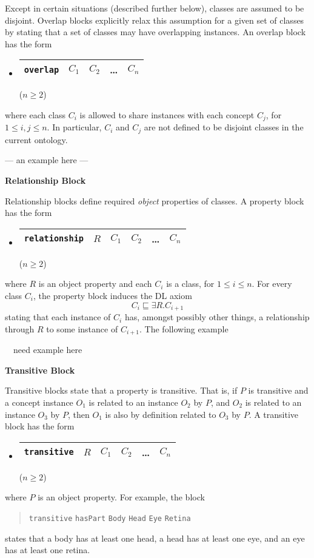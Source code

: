 \documentclass[preprint,number]{elsarticle}
\newcommand{\mypara}[1]{\vspace{12pt}\noindent\textbf{#1}}
\begin{document}
\mypara{}Except in certain situations (described further below),
classes are assumed to be disjoint.  Overlap blocks explicitly relax
this assumption for a given set of classes by stating that a set of
classes may have overlapping instances. An overlap block has the form
\begin{itemize}
\item[] 
  \begin{tabular}{|l|l|l|l|l|}\hline
    \texttt{overlap} & $C_1$ & $C_2$ & \dots & $C_n$ \\ \hline 
  \end{tabular} \hfill ($n \ge 2$)
\end{itemize}
where each class $C_i$ is allowed to share instances with each concept
$C_j$, for $1 \le i,j \le n$. In particular, $C_i$ and $C_j$ are not
defined to be disjoint classes in the current ontology. 

--- an example here ---


\mypara{Relationship Block}

\mypara{}Relationship blocks define required \emph{object} properties
of classes. A property block has the form
\begin{itemize}
\item[]
  \begin{tabular}{|l|l|l|l|l|l|}\hline \texttt{relationship} & $R$ & $C_1$
    & $C_2$ & \dots & $C_n$ \\ \hline
  \end{tabular} \hfill ($n \ge 2$)
\end{itemize}
where $R$ is an object property and each $C_i$ is a class, for $1 \le
i \le n$.  For every class $C_i$, the property block induces the DL
axiom \[C_i \sqsubseteq \exists R . C_{i+1} \] stating that each
instance of $C_i$ has, amongst possibly other things, a relationship
through $R$ to some instance of $C_{i+1}$.  The following example
\begin{tabbing}
   ~~need example here
\end{tabbing}

\mypara{Transitive Block} 

\mypara{}Transitive blocks state that a property is transitive. That
is, if $P$ is transitive and a concept instance $O_1$ is related to an
instance $O_2$ by $P$, and $O_2$ is related to an instance $O_3$ by
$P$, then $O_1$ is also by definition related to $O_3$ by $P$. A
transitive block has the form
\begin{itemize}
\item[]
  \begin{tabular}{|l|l|l|l|l|l|}\hline \texttt{transitive} & $R$ & $C_1$
    & $C_2$ & \dots & $C_n$ \\ \hline
  \end{tabular} \hfill ($n \ge 2$)
\end{itemize}
where $P$ is an object property. For example, the block
\begin{quote}\texttt{transitive} \texttt{hasPart} \texttt{Body}
  \texttt{Head} \texttt{Eye} \texttt{Retina}
\end{quote} states that a body has at least one head, a head has at
least one eye, and an eye has at least one retina.
\end{document}
